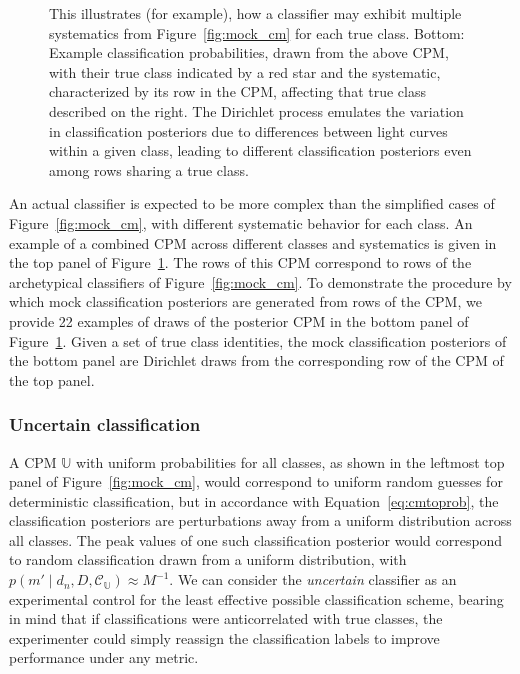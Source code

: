 \begin{figure}
\begin{center}
{		This illustrates (for example), how a classifier may exhibit multiple systematics from Figure~\ref{fig:mock_cm} for each true class.
		Bottom: Example classification probabilities, drawn from the above CPM, with their true class indicated by a red star and the systematic, characterized by its row in the CPM, affecting that true class described on the right.
		The Dirichlet process emulates the variation in classification posteriors due to differences between light curves within a given class, leading to different classification posteriors even among rows sharing a true class.
		}
		\label{fig:mock_probs}
	\end{center}
\end{figure}

An actual classifier is expected to be more complex than the simplified cases of Figure~\ref{fig:mock_cm}, with different systematic behavior for each class.
An example of a combined CPM across different classes and systematics is given in the top panel of Figure~\ref{fig:mock_probs}.
The rows of this CPM correspond to rows of the archetypical classifiers of Figure~\ref{fig:mock_cm}.
To demonstrate the procedure by which mock classification posteriors are generated from rows of the CPM, we provide 22 examples of draws of the posterior CPM in the bottom panel of Figure~\ref{fig:mock_probs}.
Given a set of true class identities, the mock classification posteriors of the bottom panel are Dirichlet draws from the corresponding row of the CPM of the top panel.

\subsubsection{Uncertain classification}
\label{sec:uncertaindata}

A CPM $\mathbb{U}$ with uniform probabilities for all classes, as shown in the leftmost top panel of Figure~\ref{fig:mock_cm}, would correspond to uniform random guesses for deterministic classification, but in accordance with Equation~\ref{eq:cmtoprob}, the classification posteriors are perturbations away from a uniform distribution across all classes.
The peak values of one such classification posterior would correspond to random classification drawn from a uniform distribution, with $p(m' \mid d_{n}, D, \mathcal{C}_{\mathbb{U}}) \approx M^{-1}$.
We can consider the \textit{uncertain} classifier as an experimental control for the least effective possible classification scheme, bearing in mind that if classifications were anticorrelated with true classes, the experimenter could simply reassign the classification labels to improve performance under any metric.

